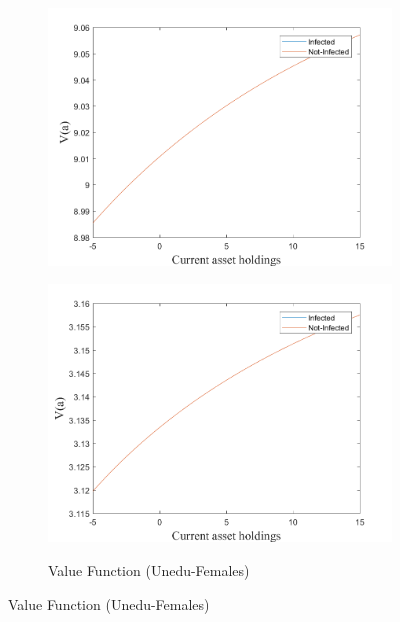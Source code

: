 \begin{figure}[H]
\begin{subfigure}{0.5\textwidth}
   \includegraphics[width=\linewidth,height = 0.22\textheight]{figures/mio/FIG15.png}
    \label{fig_dert}
\end{subfigure}
\hspace*{\fill}
\begin{subfigure}{0.5\textwidth}\caption{Value Function (Unedu-Females)}
   \includegraphics[width=\linewidth,height = 0.22\textheight]{figures/mio/FIG16.png}
    \label{fig:x_b}
\end{subfigure}
\hspace*{\fill}
\end{figure}

